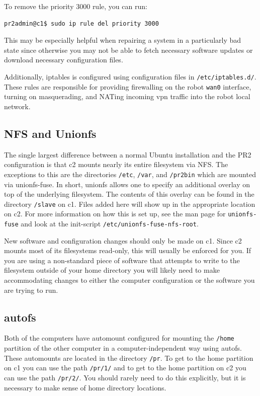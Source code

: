 To remove the priority 3000 rule, you can run:
\begin{verbatim}
pr2admin@c1$ sudo ip rule del priority 3000
\end{verbatim}
This may be especially helpful when repairing a system in a
particularly bad state since otherwise you may not be able to fetch
necessary software updates or download necessary configuration files.

Additionally, iptables is configured using configuration files in
\texttt{/etc/iptables.d/}.  These rules are responsible for providing
firewalling on the robot \texttt{wan0} interface, turning on
masquerading, and NATing incoming vpn traffic into the robot local
network.

\subsection{NFS and Unionfs}
The single largest difference between a normal Ubuntu installation and
the PR2 configuration is that c2 mounts nearly its entire filesystem
via NFS.  The exceptions to this are the directories \texttt{/etc},
\texttt{/var}, and \texttt{/pr2bin} which are mounted via
unionfs-fuse.  In short, unionfs allows one to specify an additional
overlay on top of the underlying filesystem.  The contents of this
overlay can be found in the directory \texttt{/slave} on c1.  Files
added here will show up in the appropriate location on c2.  For more
information on how this is set up, see the man page for
\texttt{unionfs-fuse} and look at the init-script
\texttt{/etc/unionfs-fuse-nfs-root}.

New software and configuration changes should only be made on c1.
Since c2 mounts most of its filesystems read-only, this will usually
be enforced for you.  If you are using a non-standard piece of
software that attempts to write to the filesystem outside of your home
directory you will likely need to make accommodating changes to either
the computer configuration or the software you are trying to run.

\subsection{autofs}
Both of the computers have automount configured for mounting the
\texttt{/home} partition of the other computer in a
computer-independent way using autofs. These automounts are located in
the directory \texttt{/pr}. To get to the home partition on c1 you can
use the path \texttt{/pr/1/} and to get to the home partition on c2
you can use the path \texttt{/pr/2/}. You should rarely need to do
this explicitly, but it is necessary to make sense of home directory
locations.

